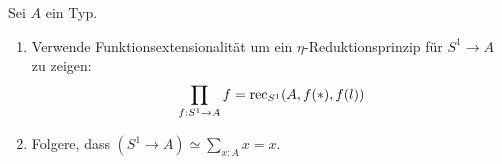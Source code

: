 \documentclass{uebung}
\begin{document}
\begin{exercise}
  Sei $A$ ein Typ.
  \begin{enumerate}
    \item Verwende Funktionsextensionalität um ein $\eta$-Reduktionsprinzip für $S^1 \to A$ zu zeigen:
      $$
      \prod_{f:S^1 \to A} f = \mathrm{rec}_{S^1}(A, f(\ast), f(l))
      $$
    \item Folgere, dass $(S^1\to A) \simeq \sum_{x:A} x=x$.
  \end{enumerate}
\end{exercise}
\end{document}
